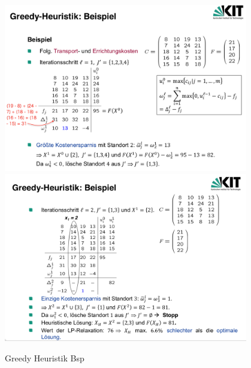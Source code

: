           

        \begin{exmp}
          
        \end{exmp}

        \begin{figure}[H]
          \centering
          \includegraphics[width=0.95\textwidth]{Images/Greedy_Heuristik_Bsp(1).png}
          \includegraphics[width=0.95\textwidth]{Images/Greedy_Heuristik_Bsp(2).png}
          \caption{Greedy Heuristik Bsp}
          \label{fig:Greedy_Heuristik_Bsp}
        \end{figure}

        \begin{exmp}
          \color{blue}{Aufgabe 14}
        \end{exmp}

